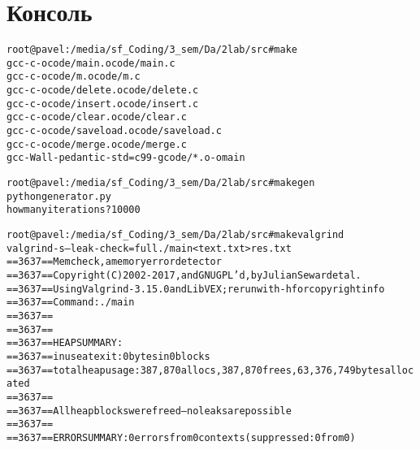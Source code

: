 \section{Консоль}
\begin{alltt}
root@pavel:/media/sf_Coding/3_sem/Da/2lab/src# make
gcc    -c -o code/main.o code/main.c
gcc    -c -o code/m.o code/m.c
gcc    -c -o code/delete.o code/delete.c
gcc    -c -o code/insert.o code/insert.c
gcc    -c -o code/clear.o code/clear.c
gcc    -c -o code/saveload.o code/saveload.c
gcc    -c -o code/merge.o code/merge.c
gcc -Wall -pedantic -std=c99 -g code/*.o -o main

root@pavel:/media/sf_Coding/3_sem/Da/2lab/src# make gen
python generator.py
how many iterations?	10000

root@pavel:/media/sf_Coding/3_sem/Da/2lab/src# make valgrind
valgrind -s --leak-check=full ./main < text.txt > res.txt
==3637== Memcheck, a memory error detector
==3637== Copyright (C) 2002-2017, and GNU GPL'd, by Julian Seward et al.
==3637== Using Valgrind-3.15.0 and LibVEX; rerun with -h for copyright info
==3637== Command: ./main
==3637==
==3637==
==3637== HEAP SUMMARY:
==3637==     in use at exit: 0 bytes in 0 blocks
==3637==   total heap usage: 387,870 allocs, 387,870 frees, 63,376,749 bytes allocated
==3637==
==3637== All heap blocks were freed -- no leaks are possible
==3637==
==3637== ERROR SUMMARY: 0 errors from 0 contexts (suppressed: 0 from 0)
\end{alltt}

\pagebreak